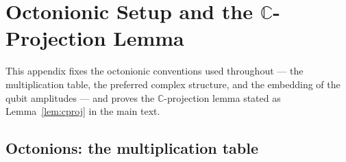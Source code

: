 %
%

\section{Octonionic Setup and the \texorpdfstring{$\mathbb{C}$}{C}-Projection Lemma}\label{app:ghz-w-proofs}
\label{app:setup}

This appendix fixes the octonionic conventions used throughout --- the multiplication table, the
preferred complex structure, and the embedding of the qubit amplitudes --- and proves the
$\mathbb{C}$-projection lemma stated as Lemma~\ref{lem:cproj} in the main text.

\subsection{Octonions: the multiplication table}

